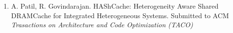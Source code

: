 \documentclass[oneside,12pt]{iiscmastersthesis}
\newcommand{\blankpage}{
\newpage
\thispagestyle{empty}
\mbox{}
\newpage
}
\newcommand{\blankpagewithnumber}{
\newpage
\mbox{}
\newpage
}
\begin{document}

\setcounter{secnumdepth}{3}
\setcounter{tocdepth}{3}

\frontmatter %


% 



\begin{enumerate}
	\item A. Patil, R. Govindarajan. HAShCache: Heterogeneity Aware Shared DRAMCache for Integrated Heterogeneous Systems. Submitted to ACM \textit{Trasactions on Architecture and Code Optimization (TACO)}
\end{enumerate}


\blankpage




\tableofcontents
\blankpagewithnumber
\listoffigures
\listoftables



\mainmatter %
\setcounter{page}{1}








% 
% 


%
%

\end{document}

